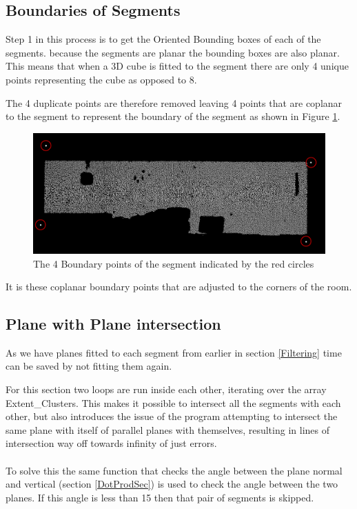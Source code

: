		\subsection{Boundaries of Segments}
		\label{boundaries}
			Step 1 in this process is to get the Oriented Bounding boxes of each of the segments. because the segments are planar the bounding boxes are also planar. This means that when a 3D cube is fitted to the segment there are only 4 unique points representing the cube as opposed to 8.
			
			The 4 duplicate points are therefore removed leaving 4 points that are coplanar to the segment to represent the boundary of the segment as shown in Figure \ref{fig:BOundingBox}.
		
			\begin{figure}[H]
				\centering
				\includegraphics[width=1\linewidth]{"Includes/images/Bounding Box/BOunding Box"}
				\caption{The 4 Boundary points of the segment indicated by the red circles}
				\label{fig:BOundingBox}
			\end{figure}
			It is these coplanar boundary points that are adjusted to the corners of the room.
			
		\subsection{Plane with Plane intersection}
		\label{planeInterResults}
			As we have planes fitted to each segment from earlier in section \ref{Filtering} time can be saved by not fitting them again.
			
			For this section two loops are run inside each other, iterating over the array Extent\_Clusters. This makes it possible to intersect all the segments with each other, but also introduces the issue of the program attempting to intersect the same plane with itself of parallel planes with themselves, resulting in lines of intersection way off towards infinity of just errors.\\
			\\
			To solve this the same function that checks the angle between the plane normal and vertical (section \ref{DotProdSec}) is used to check the angle between the two planes. If this angle is less than 15\textdegree\: then that pair of segments is skipped.
			
